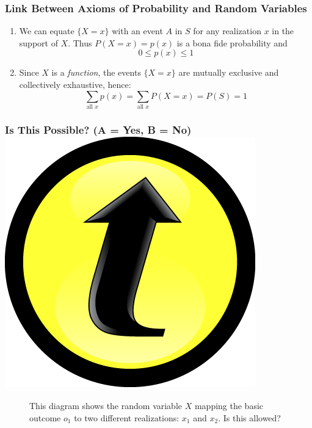 \documentclass[handout]{beamer}
\begin{document}
\begin{frame}
	\frametitle{Link Between Axioms of Probability and Random Variables}

	\begin{enumerate}
		\item We can equate $\{X=x\}$ with an event $A$ in $S$ for any realization $x$ in the support of $X$. Thus $P(X=x) = p(x)$ is a bona fide probability and
				$$0 \leq p(x) \leq 1$$
		\item Since $X$ is a \emph{function}, the events $\{X= x\}$ are \alert{mutually exclusive} and \alert{collectively exhaustive}, hence:
		$$\sum_{\mbox{all } x} p(x) = \sum_{\mbox{all } x} P(X=x) = P(S) = 1$$
	\end{enumerate}

\end{frame}

\begin{frame}
\frametitle{Is This Possible? (A = Yes, B = No) \hfill \includegraphics[scale = 0.05]{./images/clicker}}

\begin{figure}
\caption{This diagram shows the random variable $X$ mapping the basic outcome $o_1$ to two different realizations: $x_1$ and $x_2$. Is this allowed?}
\end{figure}

\end{frame}
\end{document}
